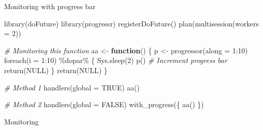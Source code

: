 \documentclass[
  ignorenonframetext,
  usenames,
  dvipsnames]{beamer}
\newenvironment{Shaded}{\begin{snugshade}}{\end{snugshade}}
\newcommand{\AttributeTok}[1]{\textcolor[rgb]{0.77,0.63,0.00}{#1}}
\newcommand{\CommentTok}[1]{\textcolor[rgb]{0.56,0.35,0.01}{\textit{#1}}}
\newcommand{\ConstantTok}[1]{\textcolor[rgb]{0.00,0.00,0.00}{#1}}
\newcommand{\ControlFlowTok}[1]{\textcolor[rgb]{0.13,0.29,0.53}{\textbf{#1}}}
\newcommand{\DecValTok}[1]{\textcolor[rgb]{0.00,0.00,0.81}{#1}}
\newcommand{\FunctionTok}[1]{\textcolor[rgb]{0.00,0.00,0.00}{#1}}
\newcommand{\NormalTok}[1]{#1}
\newcommand{\OtherTok}[1]{\textcolor[rgb]{0.56,0.35,0.01}{#1}}
\newcommand{\SpecialCharTok}[1]{\textcolor[rgb]{0.00,0.00,0.00}{#1}}
\begin{document}
\begin{frame}[fragile]{Monitoring with progress bar}
\protect\hypertarget{monitoring-with-progress-bar}{}
\tiny

\begin{Shaded}
\begin{Highlighting}[]
\FunctionTok{library}\NormalTok{(doFuture)}
\FunctionTok{library}\NormalTok{(progressr)}
\FunctionTok{registerDoFuture}\NormalTok{()}
\FunctionTok{plan}\NormalTok{(}\FunctionTok{multisession}\NormalTok{(}\AttributeTok{workers =} \DecValTok{2}\NormalTok{))}

\CommentTok{\# Monitoring this function}
\NormalTok{aa }\OtherTok{\textless{}{-}} \ControlFlowTok{function}\NormalTok{() \{}
\NormalTok{  p }\OtherTok{\textless{}{-}} \FunctionTok{progressor}\NormalTok{(}\AttributeTok{along =} \DecValTok{1}\SpecialCharTok{:}\DecValTok{10}\NormalTok{)}
  \FunctionTok{foreach}\NormalTok{(}\AttributeTok{i =} \DecValTok{1}\SpecialCharTok{:}\DecValTok{10}\NormalTok{) }\SpecialCharTok{\%dopar\%}\NormalTok{ \{}
    \FunctionTok{Sys.sleep}\NormalTok{(}\DecValTok{2}\NormalTok{)}
    \FunctionTok{p}\NormalTok{() }\CommentTok{\# Increment progress bar}
    \FunctionTok{return}\NormalTok{(}\ConstantTok{NULL}\NormalTok{)}
\NormalTok{  \}}
  \FunctionTok{return}\NormalTok{(}\ConstantTok{NULL}\NormalTok{)}
\NormalTok{\}}

\CommentTok{\# Method 1}
\FunctionTok{handlers}\NormalTok{(}\AttributeTok{global =} \ConstantTok{TRUE}\NormalTok{)}
\FunctionTok{aa}\NormalTok{()}

\CommentTok{\# Method 2}
\FunctionTok{handlers}\NormalTok{(}\AttributeTok{global =} \ConstantTok{FALSE}\NormalTok{)}
\FunctionTok{with\_progress}\NormalTok{(\{}
  \FunctionTok{aa}\NormalTok{()}
\NormalTok{\})}
\end{Highlighting}
\end{Shaded}

\normalsize
\end{frame}

\begin{frame}{Monitoring}
\protect\hypertarget{monitoring-1}{}
\end{frame}
\end{document}

